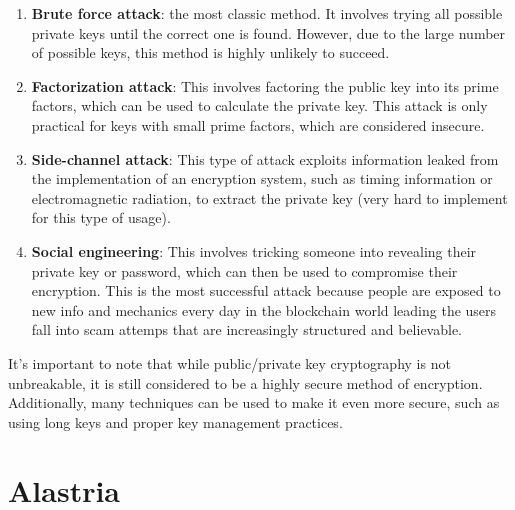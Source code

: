 \documentclass[target=mst,aauheader=]{thud}
\begin{document}
    \begin{enumerate}

        \item \textbf{Brute force attack}: the most classic method. It involves trying all possible private keys until the correct one is found. However, due to the large number of possible keys, this method is highly unlikely to succeed.
        \item \textbf{Factorization attack}: This involves factoring the public key into its prime factors, which can be used to calculate the private key. This attack is only practical for keys with small prime factors, which are considered insecure.
        \item \textbf{Side-channel attack}: This type of attack exploits information leaked from the implementation of an encryption system, such as timing information or electromagnetic radiation, to extract the private key (very hard to implement for this type of usage).
        \item \textbf{Social engineering}: This involves tricking someone into revealing their private key or password, which can then be used to compromise their encryption. This is the most successful attack because people are exposed to new info and mechanics every day in the blockchain world leading the users fall into scam attemps that are increasingly structured and believable.

    \end{enumerate}

    It's important to note that while public/private key cryptography is not unbreakable, it is still considered to be a highly secure method of encryption. Additionally, many techniques can be used to make it even more secure, such as using long keys and proper key management practices.
    
    \section{Alastria}
\end{document}
